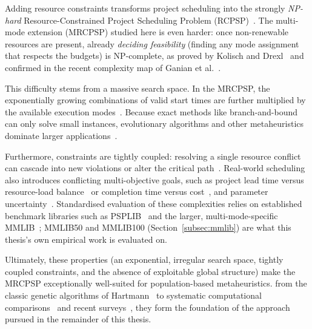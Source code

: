 Adding resource constraints transforms project scheduling into the strongly \emph{NP-hard} Resource-Constrained Project Scheduling Problem (RCPSP)~\cite{blazewicz1983,ganian2020complexity}. The multi-mode extension (MRCPSP) studied here is even harder: once non-renewable resources are present, already \emph{deciding feasibility} (finding any mode assignment that respects the budgets) is NP-complete, as proved by Kolisch and Drexl~\cite{kolischdrexl1994} and confirmed in the recent complexity map of Ganian et al.~\cite{ganian2020complexity}.

This difficulty stems from a massive search space. In the MRCPSP, the exponentially growing combinations of valid start times are further multiplied by the available execution modes~\cite{kolischdrexl1994,hartmann2010survey}. Because exact methods like branch-and-bound can only solve small instances, evolutionary algorithms and other metaheuristics dominate larger applications~\cite{hartmann2002,kolisch2006,khajesaeedi2025review}.

Furthermore, constraints are tightly coupled: resolving a single resource conflict can cascade into new violations or alter the critical path~\cite{demeulemeester2002,khajesaeedi2025review}. Real-world scheduling also introduces conflicting multi-objective goals, such as project lead time versus resource-load balance~\cite{yang2024biobjective} or completion time versus cost~\cite{tian2022multiskill}, and parameter uncertainty~\cite{herroelen2005,ramos2023stochastic}. Standardised evaluation of these complexities relies on established benchmark libraries such as PSPLIB~\cite{kolisch1997} and the larger, multi-mode-specific MMLIB~\cite{vanpeteghem2014}; MMLIB50 and MMLIB100 (Section~\ref{subsec:mmlib}) are what this thesis's own empirical work is evaluated on.

Ultimately, these properties (an exponential, irregular search space, tightly coupled constraints, and the absence of exploitable global structure) make the MRCPSP exceptionally well-suited for population-based metaheuristics.  from the classic genetic algorithms of Hartmann~\cite{hartmann1998,hartmann2002} to systematic computational comparisons~\cite{kolisch2006,vanpeteghem2014} and recent surveys~\cite{khajesaeedi2025review,dokeroglu2025metaheuristics}, they form the foundation of the approach pursued in the remainder of this thesis.
